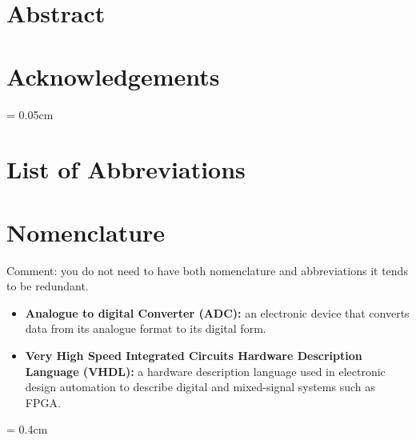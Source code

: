 \documentclass[a4paper, 12pt, onecolumn, twoside]{report}
\begin{document}
\addtocounter{page}{-1}
\chapter*{Abstract}

\clearpage

\chapter*{Acknowledgements}

%
\clearpage
\parskip = 0.05cm
\pagestyle{fancy}
\tableofcontents \clearpage
\listoffigures \clearpage %
\listoftables \clearpage
{} %
\chapter*{List of Abbreviations}

\clearpage
{} %

\chapter*{Nomenclature}

Comment: you do not need to have both nomenclature and abbreviations it tends to be redundant.

\begin{itemize}

\item {\bf Analogue to digital Converter (ADC):} an electronic device that converts data from its analogue format to its digital form.

\item {\bf Very High Speed Integrated Circuits Hardware Description Language (VHDL):} a hardware description language used in electronic design automation to describe digital and mixed-signal systems such as FPGA.
\end{itemize}
\clearpage
\parskip = 0.4cm
\end{document}
